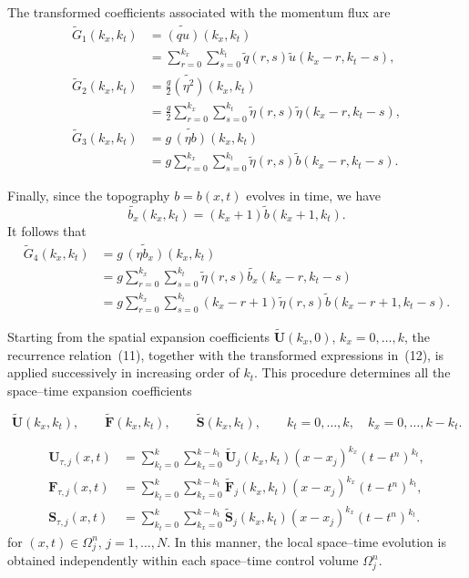\documentclass[11pt]{article}
\begin{document}
The transformed coefficients associated with the momentum flux are
\begin{align*}
    \widetilde{G}_1(k_x,k_t)
    &=
    \widetilde{(qu)}(k_x,k_t)                                     \\
    &=
    \sum_{r=0}^{k_x}\sum_{s=0}^{k_t}
    \widetilde{q}(r,s)
    \widetilde{u}(k_x-r,k_t-s),                                   \\[0.6em]
    \widetilde{G}_2(k_x,k_t)
    &=
    \frac{g}{2}\widetilde{(\eta^2)}(k_x,k_t)                       \\
    &=
    \frac{g}{2}
    \sum_{r=0}^{k_x}\sum_{s=0}^{k_t}
    \widetilde{\eta}(r,s)
    \widetilde{\eta}(k_x-r,k_t-s),                                \\[0.6em]
    \widetilde{G}_3(k_x,k_t)
    &=
    g\,\widetilde{(\eta b)}(k_x,k_t)                              \\
    &=
    g
    \sum_{r=0}^{k_x}\sum_{s=0}^{k_t}
    \widetilde{\eta}(r,s)
    \widetilde{b}(k_x-r,k_t-s).
\end{align*}

Finally, since the topography \(b=b(x,t)\) evolves in time, we have
\[
    \widetilde{b_x}(k_x,k_t)
    =
    (k_x+1)\widetilde{b}(k_x+1,k_t).
\]
It follows that
\begin{align*}
    \widetilde{G}_4(k_x,k_t)
    &=
    g\,\widetilde{(\eta b_x)}(k_x,k_t)                             \\
    &=
    g
    \sum_{r=0}^{k_x}\sum_{s=0}^{k_t}
    \widetilde{\eta}(r,s)
    \widetilde{b_x}(k_x-r,k_t-s)                                  \\
    &=
    g
    \sum_{r=0}^{k_x}\sum_{s=0}^{k_t}
    (k_x-r+1)
    \widetilde{\eta}(r,s)
    \widetilde{b}(k_x-r+1,k_t-s).
\end{align*}


Starting from the spatial expansion coefficients \(\widetilde{\mathbf{U}}(k_x,0)\), \(k_x=0,\ldots,k\), the recurrence relation~(11), together with the transformed expressions in~(12), is applied successively in increasing order of \(k_t\). This procedure determines all the space--time expansion coefficients

\[
    \widetilde{\mathbf{U}}(k_x,k_t),\qquad
    \widetilde{\mathbf{F}}(k_x,k_t),\qquad
    \widetilde{\mathbf{S}}(k_x,k_t),
    \qquad
    k_t=0,\ldots,k,\quad
    k_x=0,\ldots,k-k_t.
\]

\begin{align*}
    \mathbf{U}_{\tau,j}(x,t)
    &= \sum_{k_t=0}^{k} \sum_{k_x=0}^{k-k_t}
    \widetilde{\mathbf{U}}_j(k_x,k_t)
    (x-x_j)^{k_x}(t-t^n)^{k_t}, \\
    \mathbf{F}_{\tau,j}(x,t)
    &= \sum_{k_t=0}^{k} \sum_{k_x=0}^{k-k_t}
    \widetilde{\mathbf{F}}_j(k_x,k_t)
    (x-x_j)^{k_x}(t-t^n)^{k_t}, \\
    \mathbf{S}_{\tau,j}(x,t)
    &= \sum_{k_t=0}^{k} \sum_{k_x=0}^{k-k_t}
    \widetilde{\mathbf{S}}_j(k_x,k_t)
    (x-x_j)^{k_x}(t-t^n)^{k_t}.
\end{align*}
for \((x,t)\in\Omega_j^n\), \(j=1,\ldots,N\). In this manner, the local space--time evolution is obtained independently within each space--time control volume \(\Omega_j^n\).
 
\end{document}
